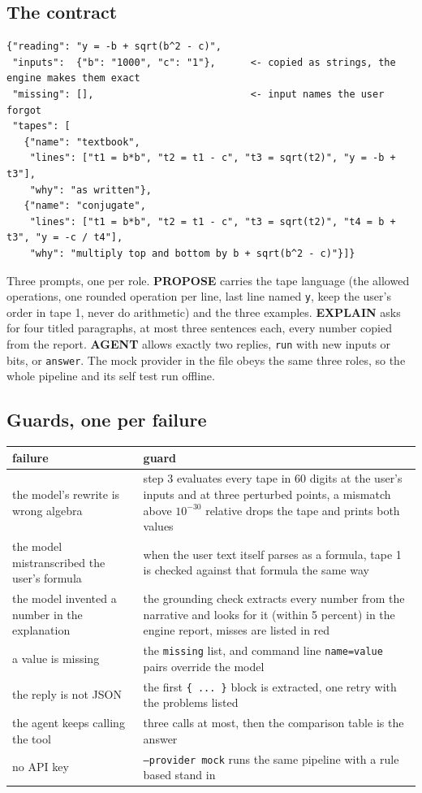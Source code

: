 \documentclass[11pt]{article}
\begin{document}
\subsection*{The contract}
\begin{lstlisting}
{"reading": "y = -b + sqrt(b^2 - c)",
 "inputs":  {"b": "1000", "c": "1"},      <- copied as strings, the engine makes them exact
 "missing": [],                           <- input names the user forgot
 "tapes": [
   {"name": "textbook",
    "lines": ["t1 = b*b", "t2 = t1 - c", "t3 = sqrt(t2)", "y = -b + t3"],
    "why": "as written"},
   {"name": "conjugate",
    "lines": ["t1 = b*b", "t2 = t1 - c", "t3 = sqrt(t2)", "t4 = b + t3", "y = -c / t4"],
    "why": "multiply top and bottom by b + sqrt(b^2 - c)"}]}
\end{lstlisting}
Three prompts, one per role. \textbf{PROPOSE} carries the tape language (the allowed operations, one rounded operation per line, last line named \texttt{y}, keep the user's order in tape 1, never do arithmetic) and the three examples. \textbf{EXPLAIN} asks for four titled paragraphs, at most three sentences each, every number copied from the report. \textbf{AGENT} allows exactly two replies, \texttt{run} with new inputs or bits, or \texttt{answer}. The mock provider in the file obeys the same three roles, so the whole pipeline and its self test run offline.

\subsection*{Guards, one per failure}
\begin{center}
\begin{tabularx}{\textwidth}{@{}lX@{}}
\toprule
failure & guard \\
\midrule
the model's rewrite is wrong algebra & step 3 evaluates every tape in 60 digits at the user's inputs and at three perturbed points, a mismatch above $10^{-30}$ relative drops the tape and prints both values \\
the model mistranscribed the user's formula & when the user text itself parses as a formula, tape 1 is checked against that formula the same way \\
the model invented a number in the explanation & the grounding check extracts every number from the narrative and looks for it (within 5 percent) in the engine report, misses are listed in red \\
a value is missing & the \texttt{missing} list, and command line \texttt{name=value} pairs override the model \\
the reply is not JSON & the first \verb|{ ... }| block is extracted, one retry with the problems listed \\
the agent keeps calling the tool & three calls at most, then the comparison table is the answer \\
no API key & \texttt{--provider mock} runs the same pipeline with a rule based stand in \\
\bottomrule
\end{tabularx}
\end{center}
\end{document}
